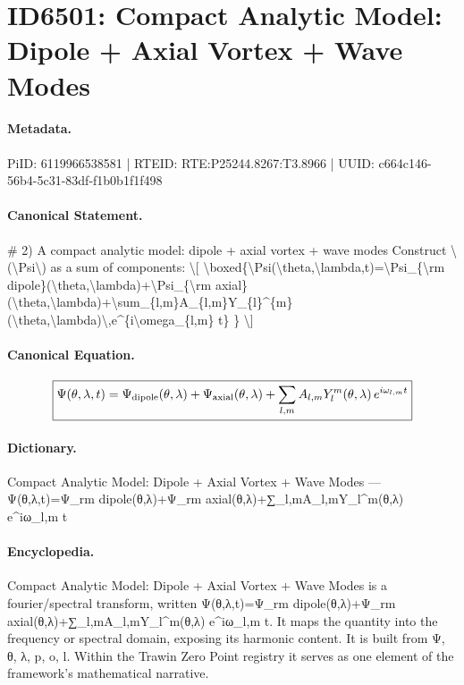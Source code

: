 \section*{ID6501: Compact Analytic Model: Dipole + Axial Vortex + Wave Modes}
\paragraph{Metadata.}
PiID: 6119966538581 | RTEID: RTE:P25244.8267:T3.8966 | UUID: c664c146-56b4-5c31-83df-f1b0b1f1f498

\paragraph{Canonical Statement.}
\# 2) A compact analytic model: dipole + axial vortex + wave modes Construct \textbackslash{}(\textbackslash{}Psi\textbackslash{}) as a sum of components: \textbackslash{}[ \textbackslash{}boxed\{\textbackslash{}Psi(\textbackslash{}theta,\textbackslash{}lambda,t)=\textbackslash{}Psi\_\{\textbackslash{}rm dipole\}(\textbackslash{}theta,\textbackslash{}lambda)+\textbackslash{}Psi\_\{\textbackslash{}rm axial\}(\textbackslash{}theta,\textbackslash{}lambda)+\textbackslash{}sum\_\{l,m\}A\_\{l,m\}Y\_\{l\}\textasciicircum{}\{m\}(\textbackslash{}theta,\textbackslash{}lambda)\textbackslash{},e\textasciicircum{}\{i\textbackslash{}omega\_\{l,m\} t\} \} \textbackslash{}]

\paragraph{Canonical Equation.}
\[
\boxed{\Psi(\theta,\lambda,t)=\Psi_{\rm dipole}(\theta,\lambda)+\Psi_{\rm axial}(\theta,\lambda)+\sum_{l,m}A_{l,m}Y_{l}^{m}(\theta,\lambda)\,e^{i\omega_{l,m} t} }
\]

\paragraph{Dictionary.}
Compact Analytic Model: Dipole + Axial Vortex + Wave Modes — Ψ(θ,λ,t)=Ψ\_rm dipole(θ,λ)+Ψ\_rm axial(θ,λ)+∑\_l,mA\_l,mY\_l\textasciicircum{}m(θ,λ) e\textasciicircum{}iω\_l,m t

\paragraph{Encyclopedia.}
Compact Analytic Model: Dipole + Axial Vortex + Wave Modes is a fourier/spectral transform, written Ψ(θ,λ,t)=Ψ\_rm dipole(θ,λ)+Ψ\_rm axial(θ,λ)+∑\_l,mA\_l,mY\_l\textasciicircum{}m(θ,λ) e\textasciicircum{}iω\_l,m t. It maps the quantity into the frequency or spectral domain, exposing its harmonic content. It is built from Ψ, θ, λ, p, o, l. Within the Trawin Zero Point registry it serves as one element of the framework's mathematical narrative.
